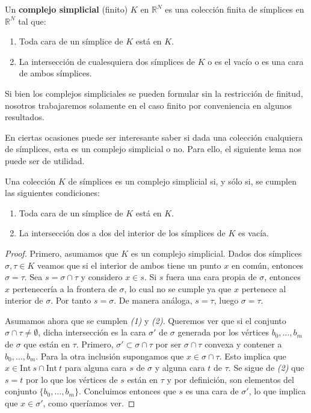 \begin{definicion}
	Un \textbf{complejo simplicial} (finito) $K$ en $\mathbb{R}^{N}$ es una
	colección finita de símplices en $\mathbb{R}^{N}$ tal que:
	\begin{enumerate}
		\item Toda cara de un símplice de $K$ está en $K$.
		
		\item La intersección de cualesquiera dos símplices de $K$ o es el vacío o es
		una cara de ambos símplices.
	\end{enumerate}
\end{definicion}
\begin{nota}
	Si bien los complejos simpliciales se pueden formular sin la restricción de finitud,
	nosotros trabajaremos solamente en el caso finito por conveniencia en algunos
	resultados.
\end{nota}

En ciertas ocasiones puede ser interesante saber si dada una colección
cualquiera de símplices, esta es un complejo simplicial o no. Para ello, el siguiente
lema nos puede ser de utilidad.

\begin{lema}
	Una colección $K$ de símplices es un complejo simplicial si, y sólo si, se cumplen
	las siguientes condiciones:
	\begin{enumerate}
		\item Toda cara de un símplice de $K$ está en $K$.
		
		\item La intersección dos a dos del interior de los símplices de $K$ es vacía.
	\end{enumerate}
\end{lema}
\begin{proof}
	Primero, asumamos que $K$ es un complejo simplicial. Dados dos símplices $\sigma
	, \tau \in K$ veamos que si el interior de ambos tiene un punto $x$ en común,
	entonces $\sigma = \tau$. Sea $s = \sigma \cap \tau$ y considero $x \in s$. Si
	$s$ fuera una cara propia de $\sigma$, entonces $x$ pertenecería a la frontera
	de $\sigma$, lo cual no se cumple ya que $x$ pertenece al interior de $\sigma$.
	Por tanto $s = \sigma$. De manera análoga, $s = \tau$, luego $\sigma = \tau$.
	
	Asumamos ahora que se cumplen \textit{(1)} y \textit{(2)}. Queremos ver que si
	el conjunto $\sigma \cap \tau \neq \emptyset$, dicha intersección es la cara
	$\sigma'$ de $\sigma$ generada por los vértices $b_{0},\dots,b_{m}$ de
	$\sigma$ que están en $\tau$. Primero, $\sigma' \subset \sigma \cap \tau$ por
	ser $\sigma \cap \tau$ convexa y contener a $b_{0}, \dots, b_{m}$. Para la otra
	inclusión supongamos que $x \in \sigma \cap \tau$. Esto implica que
	$x \in \text{Int}\ s \cap \text{Int}\ t$ para alguna cara $s$ de $\sigma$ y
	alguna cara $t$ de $\tau$. Se sigue de \textit{(2)} que $s = t$ por lo que los
	vértices de $s$ están en $\tau$ y por definición, son elementos del conjunto $\{
	b_{0}, \dots, b_{m}\}$. Concluimos entonces que $s$ es una cara de $\sigma'$, lo
	que implica que $x \in \sigma'$, como queríamos ver.
\end{proof}

